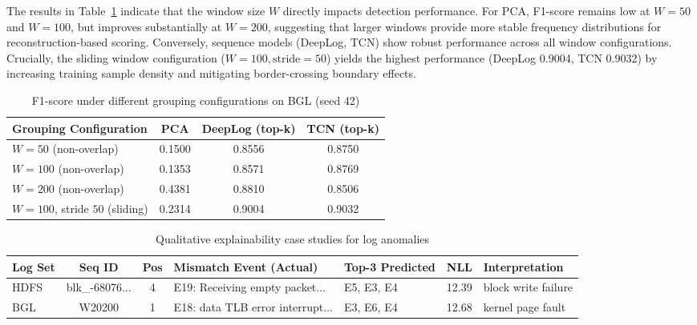 \documentclass[conference]{IEEEtran}
\begin{document}
The results in Table~\ref{tab_grouping} indicate that the window size $W$ directly impacts detection performance. For PCA, F1-score remains low at $W=50$ and $W=100$, but improves substantially at $W=200$, suggesting that larger windows provide more stable frequency distributions for reconstruction-based scoring. Conversely, sequence models (DeepLog, TCN) show robust performance across all window configurations. Crucially, the sliding window configuration ($W{=}100, \text{stride}=50$) yields the highest performance (DeepLog 0.9004, TCN 0.9032) by increasing training sample density and mitigating border-crossing boundary effects.

\begin{table}[htbp]
\caption{F1-score under different grouping configurations on BGL (seed 42)}
\begin{center}
\scriptsize
\setlength{\tabcolsep}{3pt}
\begin{tabular}{lccc}
\toprule
\textbf{Grouping Configuration} & \textbf{PCA} & \textbf{DeepLog (top-k)} & \textbf{TCN (top-k)} \\
\midrule
$W=50$ (non-overlap) & 0.1500 & 0.8556 & 0.8750 \\
$W=100$ (non-overlap) & 0.1353 & 0.8571 & 0.8769 \\
$W=200$ (non-overlap) & 0.4381 & 0.8810 & 0.8506 \\
$W=100$, stride $50$ (sliding) & 0.2314 & 0.9004 & 0.9032 \\
\bottomrule
\end{tabular}
\label{tab_grouping}
\end{center}
\end{table}

\begin{table}[htbp]
\caption{Qualitative explainability case studies for log anomalies}
\begin{center}
\scriptsize
\setlength{\tabcolsep}{2pt}
\begin{tabular}{lccp{2.2cm}p{1.0cm}cp{1.2cm}}
\toprule
\textbf{Log Set} & \textbf{Seq ID} & \textbf{Pos} & \textbf{Mismatch Event (Actual)} & \textbf{Top-3 Predicted} & \textbf{NLL} & \textbf{Interpretation} \\
\midrule
HDFS & blk\_-68076... & 4 & E19: Receiving empty packet... & E5, E3, E4 & 12.39 & block write failure \\
BGL & W20200 & 1 & E18: data TLB error interrupt... & E3, E6, E4 & 12.68 & kernel page fault \\
\bottomrule
\end{tabular}
\label{tab_explainability}
\end{center}
\end{table}
\end{document}
